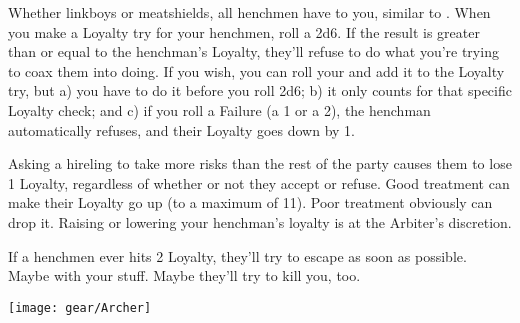 

Whether linkboys or meatshields, all henchmen have  to you, similar to .  When you make a Loyalty try for your henchmen, roll a 2d6. If the result is greater than or equal to the henchman's Loyalty, they'll refuse to do what you're trying to coax them into doing.  If you wish, you can roll your \PRE and add it to the Loyalty try, but a) you have to do it before you roll 2d6; b) it only counts for that specific Loyalty check;  and c) if you roll a Failure (a 1 or a 2), the henchman automatically refuses, and their Loyalty goes down by 1.

    Asking a hireling to take more risks than the rest of the party causes them to lose 1 Loyalty, regardless of whether or not they accept or refuse. Good treatment can make their Loyalty go up (to a maximum of 11).  Poor treatment obviously can drop it.  Raising or lowering your henchman's loyalty is at the Arbiter's discretion.

    If a henchmen ever hits 2 Loyalty, they'll try to escape as soon as possible.  Maybe with your stuff.  Maybe they'll try to kill you, too.

\begin{center}
\texttt{[image: gear/Archer]}
\end{center}







